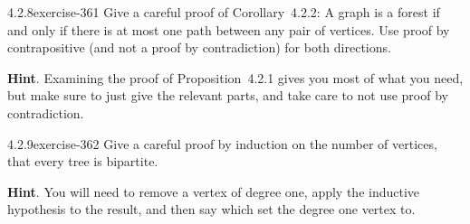 \documentclass[twoside,11pt,]{book}
\numberwithin{equation}{chapter}
\begin{document}
\begin{divisionsolution}{4.2.8}{}{exercise-361}%
\hypertarget{p-4599}{}%
Give a careful proof of Corollary~4.2.2: A graph is a forest if and only if there is at most one path between any pair of vertices.  Use proof by contrapositive (and not a proof by contradiction) for both directions.%
\par\smallskip%
\noindent\textbf{Hint}.\quad%
\hypertarget{p-4600}{}%
Examining the proof of Proposition~4.2.1 gives you most of what you need, but make sure to just give the relevant parts, and take care to not use proof by contradiction.%
\end{divisionsolution}%
\begin{divisionsolution}{4.2.9}{}{exercise-362}%
\hypertarget{p-4601}{}%
Give a careful proof by induction on the number of vertices, that every tree is bipartite.%
\par\smallskip%
\noindent\textbf{Hint}.\quad%
\hypertarget{p-4602}{}%
You will need to remove a vertex of degree one, apply the inductive hypothesis to the result, and then say which set the degree one vertex to.%
\end{divisionsolution}%
\end{document}
